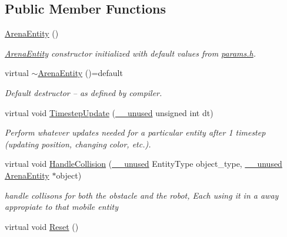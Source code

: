 \subsection*{Public Member Functions}
\begin{DoxyCompactItemize}
\item 
\hyperlink{classArenaEntity_a96df749814e89344a6149e4da89b4e44}{Arena\+Entity} ()\hypertarget{classArenaEntity_a96df749814e89344a6149e4da89b4e44}{}\label{classArenaEntity_a96df749814e89344a6149e4da89b4e44}

\begin{DoxyCompactList}\small\item\em \hyperlink{classArenaEntity}{Arena\+Entity} constructor initialized with default values from \hyperlink{params_8h}{params.\+h}. \end{DoxyCompactList}\item 
virtual \hyperlink{classArenaEntity_aa7af53e5d8830d144ccf2ad07d9140da}{$\sim$\+Arena\+Entity} ()=default\hypertarget{classArenaEntity_aa7af53e5d8830d144ccf2ad07d9140da}{}\label{classArenaEntity_aa7af53e5d8830d144ccf2ad07d9140da}

\begin{DoxyCompactList}\small\item\em Default destructor -- as defined by compiler. \end{DoxyCompactList}\item 
virtual void \hyperlink{classArenaEntity_a203613c40a5cecf47606b2a59adcc3bd}{Timestep\+Update} (\hyperlink{common_8h_a2e3484535ee610c8e19e9859563abe48}{\+\_\+\+\_\+unused} unsigned int dt)
\begin{DoxyCompactList}\small\item\em Perform whatever updates needed for a particular entity after 1 timestep (updating position, changing color, etc.). \end{DoxyCompactList}\item 
virtual void \hyperlink{classArenaEntity_aa9a83946e47cf824ce50325a4599eea8}{Handle\+Collision} (\hyperlink{common_8h_a2e3484535ee610c8e19e9859563abe48}{\+\_\+\+\_\+unused} Entity\+Type object\+\_\+type, \hyperlink{common_8h_a2e3484535ee610c8e19e9859563abe48}{\+\_\+\+\_\+unused} \hyperlink{classArenaEntity}{Arena\+Entity} $\ast$object)
\begin{DoxyCompactList}\small\item\em handle collisons for both the obstacle and the robot, Each using it in a away appropiate to that mobile entity \end{DoxyCompactList}\item 
virtual void \hyperlink{classArenaEntity_abaebe6c02659e22c08579d49829c5676}{Reset} ()\hypertarget{classArenaEntity_abaebe6c02659e22c08579d49829c5676}{}\label{classArenaEntity_abaebe6c02659e22c08579d49829c5676}


\end{DoxyCompactItemize}
